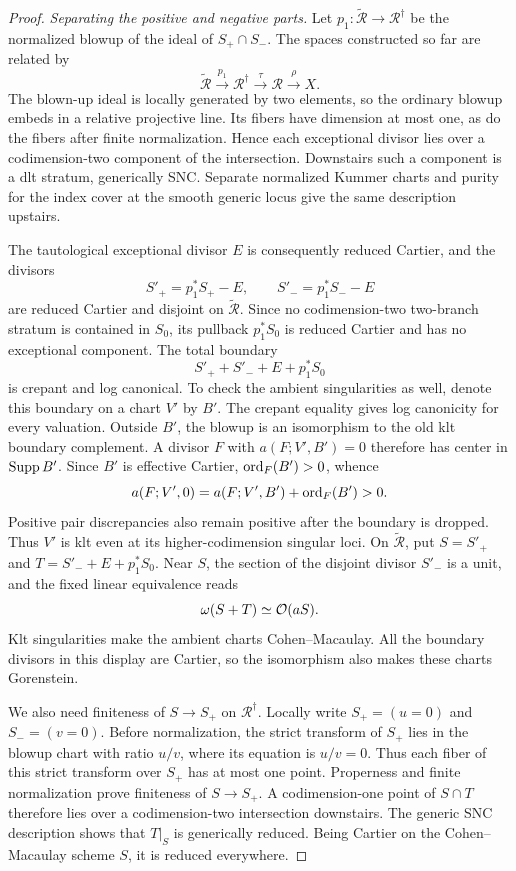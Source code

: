 \begin{proof}
\smallskip\noindent\emph{Separating the positive and negative parts.}
Let $p_1:\widetilde{\mathcal R}\to\mathcal R^\dagger$ be the
normalized blowup of the ideal of $S_+\cap S_-$. The spaces
constructed so far are related by
\[
 \widetilde{\mathcal R}\xrightarrow{p_1}\mathcal R^\dagger
 \xrightarrow{\tau}\mathcal R\xrightarrow{\rho}X.
\]
The blown-up ideal is
locally generated by two elements, so the ordinary blowup embeds
in a relative projective line.  Its fibers have dimension at
most one, as do the fibers after finite normalization.  Hence
each exceptional divisor lies over a codimension-two component
of the intersection.  Downstairs such a component is a dlt
stratum, generically SNC.  Separate normalized Kummer charts
and purity for the index cover at the smooth generic locus
give the same description upstairs.

The tautological exceptional divisor $E$ is consequently reduced
Cartier, and the divisors
\[
 S'_+=p_1^*S_+-E,\qquad S'_-=p_1^*S_--E
\]
are reduced Cartier and disjoint on $\widetilde{\mathcal R}$.
Since no codimension-two two-branch stratum is contained
in $S_0$, its pullback $p_1^*S_0$ is reduced Cartier and has no
exceptional component.  The total boundary
\[
 S'_++S'_-+E+p_1^*S_0
\]
is crepant and log canonical.  To check the ambient singularities
as well, denote this boundary on a chart $V'$ by $B'$.  The
crepant equality gives log canonicity for every valuation.
Outside $B'$, the blowup is an isomorphism to the old klt
boundary complement.  A divisor $F$ with
$a(F;V',B')=0$ therefore has center in $\operatorname{Supp} B'$.  Since $B'$
is effective Cartier, $\operatorname{ord}_F(B')>0$, whence
\[
 a(F;V',0)=a(F;V',B')+\operatorname{ord}_F(B')>0.
\]
Positive pair discrepancies also remain positive after the
boundary is dropped.  Thus $V'$ is klt even at its
higher-codimension singular loci. On $\widetilde{\mathcal R}$,
put $S=S'_+$ and $T=S'_-+E+p_1^*S_0$. Near $S$, the section of the disjoint
divisor $S'_-$ is a unit, and the fixed linear equivalence reads
\[
 \omega(S+T)\simeq\mathcal{O}(aS).
\]
Klt singularities make the ambient charts Cohen--Macaulay.
All the boundary divisors in this display are Cartier, so the
isomorphism also makes these charts Gorenstein.

We also need finiteness of $S\to S_+$ on $\mathcal R^\dagger$.
Locally write $S_+=(u=0)$ and $S_-=(v=0)$. Before normalization,
the strict transform of $S_+$ lies in the blowup chart with
ratio $u/v$, where its equation is $u/v=0$. Thus each fiber of
this strict transform over $S_+$ has at most one point.
Properness and finite normalization prove finiteness of $S\to S_+$.
A codimension-one point of $S\cap T$ therefore lies over a
codimension-two intersection downstairs.  The generic SNC
description shows that $T|_S$ is generically reduced.  Being
Cartier on the Cohen--Macaulay scheme $S$, it is reduced
everywhere.


\end{proof}
